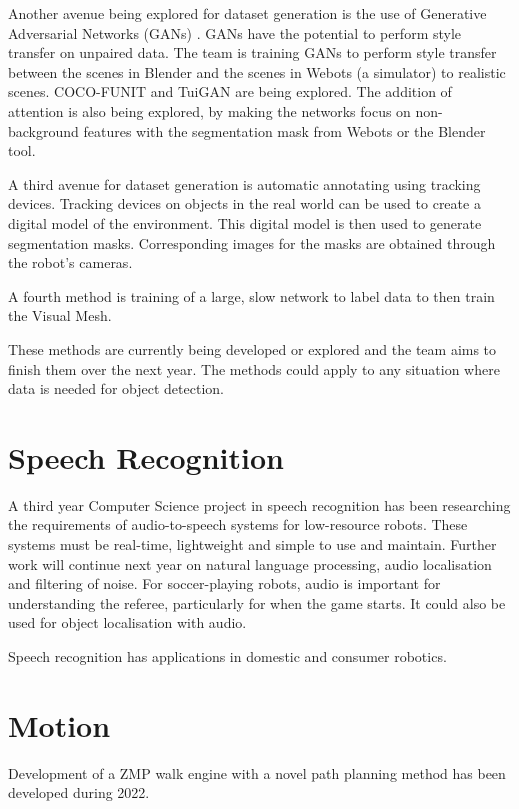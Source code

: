 \documentclass[runningheads]{llncs}
\begin{document}
Another avenue being explored for dataset generation is the use of Generative Adversarial Networks (GANs) \cite{Goodfellow2014}. GANs have the potential to perform style transfer on unpaired data. The team is training GANs to perform style transfer between the scenes in Blender and the scenes in Webots (a simulator) to realistic scenes. COCO-FUNIT \cite{saito2020coco} and TuiGAN \cite{Lin2020} are being explored. The addition of attention is also being explored, by making the networks focus on non-background features with the segmentation mask from Webots or the Blender tool. 

A third avenue for dataset generation is automatic annotating using tracking devices. Tracking devices on objects in the real world can be used to create a digital model of the environment. This digital model is then used to generate segmentation masks. Corresponding images for the masks are obtained through the robot's cameras. 

A fourth method is training of a large, slow network to label data to then train the Visual Mesh.

These methods are currently being developed or explored and the team aims to finish them over the next year. The methods could apply to any situation where data is needed for object detection. 

\section*{Speech Recognition}

A third year Computer Science project in speech recognition has been researching the requirements of audio-to-speech systems for low-resource robots. These systems must be real-time, lightweight and simple to use and maintain. Further work will continue next year on natural language processing, audio localisation and filtering of noise. For soccer-playing robots, audio is important for understanding the referee, particularly for when the game starts. It could also be used for object localisation with audio.

Speech recognition has applications in domestic and consumer robotics.

\section*{Motion}

Development of a ZMP walk engine with a novel path planning method has been developed during 2022. 
\end{document}
